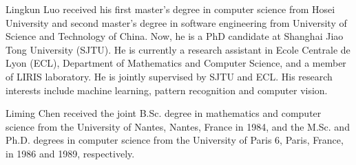 \documentclass[journal,twocolumn]{IEEEtran}
\begin{document}
\begin{CJK*}{UTF8}{gkai}
	\vspace{-10pt} 
\begin{IEEEbiography}   {Lingkun Luo}
	received his first master's degree in computer science from Hosei University and second master's degree in software engineering from University of Science and Technology of China. Now, he is a PhD candidate at Shanghai Jiao Tong University (SJTU). He is currently a research assistant in Ecole Centrale de Lyon (ECL), Department of Mathematics and Computer Science, and a member of LIRIS laboratory. He is jointly supervised by SJTU and ECL. His research interests include machine learning, pattern recognition and computer vision.
\end{IEEEbiography}
	\vspace{-5pt} 
\begin{IEEEbiography}{Liming Chen} received the joint B.Sc. degree in mathematics and computer science from the University of Nantes, Nantes, France in 1984, and the M.Sc. and Ph.D. degrees in computer science from the University of Paris 6, Paris, France, in 1986 and 1989, respectively.


\end{IEEEbiography}
\end{CJK*}
\end{document}
